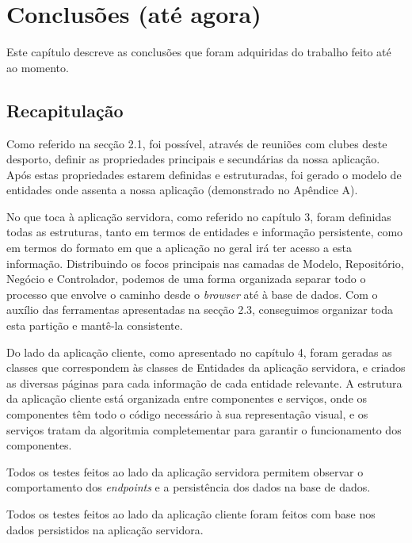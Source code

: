 %
%
\chapter{Conclusões (até agora)} \label{conclusao}
Este capítulo descreve as conclusões que foram adquiridas do trabalho feito até ao momento.

\section{Recapitulação}\label{sec61}
Como referido na secção 2.1, foi possível, através de reuniões com clubes deste desporto, definir as propriedades principais e secundárias da nossa aplicação. Após estas propriedades estarem definidas e estruturadas, foi gerado o modelo de entidades onde assenta a nossa aplicação (demonstrado no Apêndice A).

No que toca à aplicação servidora, como referido no capítulo 3, foram definidas todas as estruturas, tanto em termos de entidades e informação persistente, como em termos do formato em que a aplicação no geral irá ter acesso a esta informação. Distribuindo os focos principais nas camadas de Modelo, Repositório, Negócio e Controlador, podemos de uma forma organizada separar todo o processo que envolve o caminho desde o \emph{browser} até à base de dados. Com o auxílio das ferramentas apresentadas na secção 2.3, conseguimos organizar toda esta partição e mantê-la consistente. 

Do lado da aplicação cliente, como apresentado no capítulo 4, foram geradas as classes que correspondem às classes de Entidades da aplicação servidora, e criados as diversas páginas para cada informação de cada entidade relevante. A estrutura da aplicação cliente está organizada entre componentes e serviços, onde os componentes têm todo o código necessário à sua representação visual, e os serviços tratam da algoritmia completementar para garantir o funcionamento dos componentes.

Todos os testes feitos ao lado da aplicação servidora permitem observar o comportamento dos \emph{endpoints} e a persistência dos dados na base de dados.

Todos os testes feitos ao lado da aplicação cliente foram feitos com base nos dados persistidos na aplicação servidora.